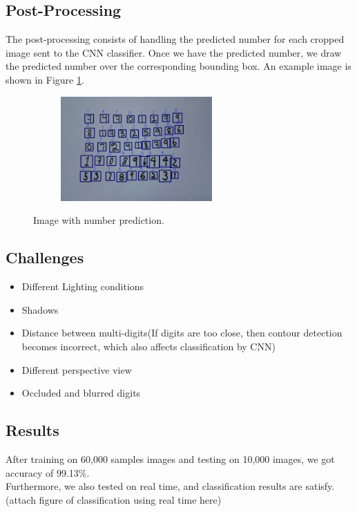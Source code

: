 \documentclass[12pt, letterpaper]{article}
\begin{document}
\subsection{Post-Processing}

The post-processing consists of handling the predicted number for each cropped image sent to the CNN classifier. Once we have the predicted number, we draw the predicted number over the corresponding bounding box. An example image is shown in Figure \ref{fig:pred}.

\begin{figure}[!h]
\begin{center}
\begin{subfigure}{0.47\textwidth}
\centering
\includegraphics*[width=0.95 \textwidth, height=4cm]{bbox_p2.png}
\end{subfigure}
\end{center}
\caption{Image with number prediction.}
\label{fig:pred}
\end{figure}


\subsection{Challenges}

	\begin{itemize}
		\item Different Lighting conditions
		\item Shadows
		\item Distance between multi-digits(If digits are too close, then contour detection becomes incorrect, which also affects classification by CNN)
		\item Different perspective view
		\item Occluded and blurred digits
	\end{itemize}

\subsection{Results}

After training on 60,000 samples images and testing on 10,000 images, we got accuracy of 99.13\%. \\
Furthermore, we also tested on real time, and classification results are satisfy.
(attach figure of classification using real time here)
\end{document}

